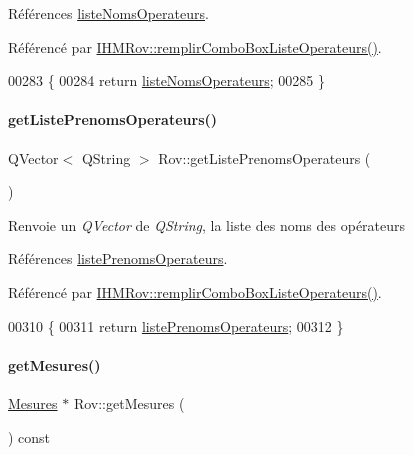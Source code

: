 Références \hyperlink{class_rov_a3d424033e0ff00f480a711358ef4fde6}{liste\+Noms\+Operateurs}.



Référencé par \hyperlink{class_i_h_m_rov_a752a8dc2b3b68d536e94ff8bfb62f46f}{I\+H\+M\+Rov\+::remplir\+Combo\+Box\+Liste\+Operateurs()}.


\begin{DoxyCode}
00283 \{
00284     \textcolor{keywordflow}{return} \hyperlink{class_rov_a3d424033e0ff00f480a711358ef4fde6}{listeNomsOperateurs};
00285 \}
\end{DoxyCode}
\mbox{\label{class_rov_a128cae6dc19025017dea26663adde765}} 
\paragraph{\texorpdfstring{get\+Liste\+Prenoms\+Operateurs()}{getListePrenomsOperateurs()}}
{\footnotesize\ttfamily Q\+Vector$<$ Q\+String $>$ Rov\+::get\+Liste\+Prenoms\+Operateurs (\begin{DoxyParamCaption}{ }\end{DoxyParamCaption})}

\begin{DoxyReturn}{Renvoie}
un {\itshape Q\+Vector} de {\itshape Q\+String}, la liste des noms des opérateurs 
\end{DoxyReturn}


Références \hyperlink{class_rov_a1e059749c13ed4ee9c0ec9168e79a3be}{liste\+Prenoms\+Operateurs}.



Référencé par \hyperlink{class_i_h_m_rov_a752a8dc2b3b68d536e94ff8bfb62f46f}{I\+H\+M\+Rov\+::remplir\+Combo\+Box\+Liste\+Operateurs()}.


\begin{DoxyCode}
00310 \{
00311     \textcolor{keywordflow}{return} \hyperlink{class_rov_a1e059749c13ed4ee9c0ec9168e79a3be}{listePrenomsOperateurs};
00312 \}
\end{DoxyCode}
\mbox{\label{class_rov_a0edd5f7db785bd856b8723fe49ca7848}} 
\paragraph{\texorpdfstring{get\+Mesures()}{getMesures()}}
{\footnotesize\ttfamily \hyperlink{class_mesures}{Mesures} $\ast$ Rov\+::get\+Mesures (\begin{DoxyParamCaption}{ }\end{DoxyParamCaption}) const}

